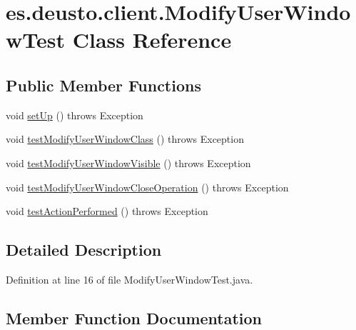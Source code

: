 \hypertarget{classes_1_1deusto_1_1client_1_1_modify_user_window_test}{}\section{es.\+deusto.\+client.\+Modify\+User\+Window\+Test Class Reference}
\label{classes_1_1deusto_1_1client_1_1_modify_user_window_test}
\subsection*{Public Member Functions}
\begin{DoxyCompactItemize}
\item 
void \hyperlink{classes_1_1deusto_1_1client_1_1_modify_user_window_test_ae1cc9b57d41fd70647e3d516173943ec}{set\+Up} ()  throws Exception 
\item 
void \hyperlink{classes_1_1deusto_1_1client_1_1_modify_user_window_test_aabc82eb3db1d8840e8d04bf05541f407}{test\+Modify\+User\+Window\+Class} ()  throws Exception 
\item 
void \hyperlink{classes_1_1deusto_1_1client_1_1_modify_user_window_test_aaa2f9f6ce4607df013e00284b44f1973}{test\+Modify\+User\+Window\+Visible} ()  throws Exception 
\item 
void \hyperlink{classes_1_1deusto_1_1client_1_1_modify_user_window_test_ae1c496d5a25114e058f9a4b3d6ee3448}{test\+Modify\+User\+Window\+Close\+Operation} ()  throws Exception 
\item 
void \hyperlink{classes_1_1deusto_1_1client_1_1_modify_user_window_test_aca6f21a450cec46bef1d520afa65562f}{test\+Action\+Performed} ()  throws Exception 
\end{DoxyCompactItemize}


\subsection{Detailed Description}


Definition at line 16 of file Modify\+User\+Window\+Test.\+java.



\subsection{Member Function Documentation}
\mbox{\label{classes_1_1deusto_1_1client_1_1_modify_user_window_test_ae1cc9b57d41fd70647e3d516173943ec}} 

